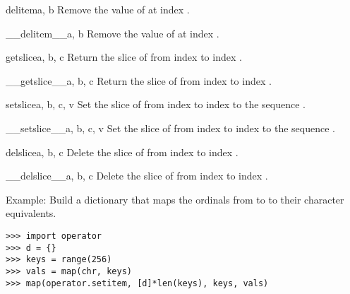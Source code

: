 \begin{funcdesc}{delitem}{a, b}
Remove the value of  at index .
\end{funcdesc}

\begin{funcdesc}{__delitem__}{a, b}
Remove the value of  at index .
\end{funcdesc}

\begin{funcdesc}{getslice}{a, b, c}
Return the slice of  from index  to index .
\end{funcdesc}

\begin{funcdesc}{__getslice__}{a, b, c}
Return the slice of  from index  to index .
\end{funcdesc}

\begin{funcdesc}{setslice}{a, b, c, v}
Set the slice of  from index  to index  to the
sequence .
\end{funcdesc}

\begin{funcdesc}{__setslice__}{a, b, c, v}
Set the slice of  from index  to index  to the
sequence .
\end{funcdesc}

\begin{funcdesc}{delslice}{a, b, c}
Delete the slice of  from index  to index .
\end{funcdesc}

\begin{funcdesc}{__delslice__}{a, b, c}
Delete the slice of  from index  to index .
\end{funcdesc}

Example: Build a dictionary that maps the ordinals from  to
 to their character equivalents.

\begin{verbatim}
>>> import operator
>>> d = {}
>>> keys = range(256)
>>> vals = map(chr, keys)
>>> map(operator.setitem, [d]*len(keys), keys, vals)
\end{verbatim}
